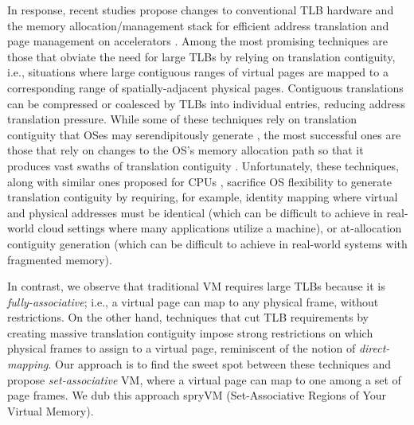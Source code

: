 In response, recent studies propose changes to conventional TLB
hardware and the memory allocation/management stack for efficient
address translation and page management on accelerators
\cite{pichai:architectural, power:supporting,
  ausavarungnirun:mosaic}. Among the most promising techniques are
those that obviate the need for large TLBs by relying on translation
contiguity, i.e., situations where large contiguous ranges of virtual
pages are mapped to a corresponding range of spatially-adjacent
physical pages. Contiguous translations can be compressed or coalesced
by TLBs into individual entries, reducing address translation
pressure. While some of these techniques rely on translation
contiguity that OSes may serendipitously generate \cite{pham:colt,
  bhattacharjee:large-reach, cox:efficient, pham:increasing}, the most
successful ones are those that rely on changes to the OS's memory
allocation path so that it produces vast swaths of translation
contiguity \cite{haria:devirtualizing}. Unfortunately, these
techniques, along with similar ones proposed for CPUs
\cite{basu:efficient, gandhi:range}, sacrifice OS flexibility to
generate translation contiguity by requiring, for example, identity
mapping where virtual and physical addresses must be identical (which
can be difficult to achieve in real-world cloud settings where many
applications utilize a machine), or at-allocation contiguity
generation (which can be difficult to achieve in real-world systems
with fragmented memory). %

In contrast, we observe that traditional VM requires large
TLBs because it is {\it fully-associative}; i.e., a virtual page can
map to any physical frame, without restrictions. On the other hand, techniques that cut TLB
requirements by creating massive translation contiguity
\cite{basu:efficient, gandhi:range, haria:devirtualizing} impose
strong restrictions on which physical frames to assign to a virtual
page, reminiscent of the notion of {\it direct-mapping}. Our approach
is to find the sweet spot between these techniques and propose {\it
  set-associative} VM, where a virtual page can map to one among a set
of page frames. We dub this approach spryVM (Set-Associative Regions
of Your Virtual Memory). 

